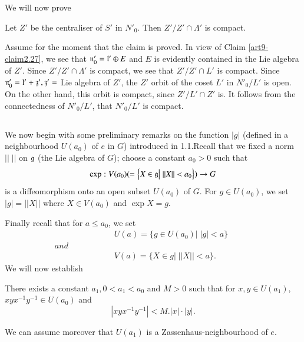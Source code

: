 We will now prove

\begin{claim}\label{art9-claim2.28}
Let $Z'$ be the centraliser of $S'$ in $N'_0$. Then $Z'/ Z' \cap \Lambda'$ is compact.
\end{claim}

Assume for the moment that the claim is proved. In view of Claim \ref{art9-claim2.27}, we see that $\mathfrak{n}'_0 = \mathfrak{l}' \oplus E$ and $E$ is evidently contained in the Lie algebra of $Z'$. Since $Z'/Z' \cap\Lambda'$ is compact, we see that $Z'/Z' \cap L'$ is compact. Since $\mathfrak{n}'_0 = \mathfrak{l}' + \mathfrak{z}', \mathfrak{z}' =$ Lie algebra of $Z'$, the $Z'$ orbit of the coset $L'$ in $N'_0/L'$ is open. On the other hand, this orbit is compact, since $Z'/L' \cap Z'$ is. It follows from the connectedness of $N'_0/L'$, that $N'_0/L'$ is compact.

\setcounter{subsection}{28}
\subsection{}\label{art9-subsec2.29}
We now begin with some preliminary remarks on the function $|g|$ (defined in a neighbourhood $U(a_0)$ of $e$ in $G$) introduced in 1.1.\pageoriginale Recall that we fixed a norm $||\;||$ on $\mathfrak{g}$ (the Lie algebra of $G$); choose a constant $a_0 > 0$ such that 
$$
\exp : V (a_0) ( = \left\{X \in \mathfrak{g} \big| \;||X || < a_0 \right\}) \to G
$$
is a diffeomorphism onto an open subset $U (a_0)$ of $G$. For $g \in U (a_0)$, we set $|g| = ||X||$ where $X \in V(a_0)$ and $\exp X = g$.

Finally recall that for $a \leqslant a_0$, we set
\begin{align*}
& U (a)  = \{g \in U(a_0) \big| \; |g| < a\}\\[-0.2cm]
and \hspace{2cm} & \hspace{7cm} \\[-0.1cm]
& V(a)  = \{X \in g \big| \; ||X|| < a\}.
\end{align*}
We will now establish

\setcounter{definition}{29}
\begin{lemma}\label{art9-lem2.30}
There exists a constant $a_1, 0 < a_1 < a_0$ and $M > 0$ such that for $x, y \in U (a_1)$, $xyx^{-1} y^{-1} \in U (a_0)$ and 
$$
|xyx^{-1} y^{-1}| < M. |x| \cdot |y|.
$$
\end{lemma}

We can assume moreover that $U (a_1)$ is a Zassenhaus-neighbourhood of $e$.

